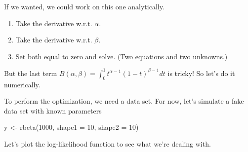 \documentclass[
]{book}
\newenvironment{Shaded}{\begin{snugshade}}{\end{snugshade}}
\newcommand{\AttributeTok}[1]{\textcolor[rgb]{0.77,0.63,0.00}{#1}}
\newcommand{\DecValTok}[1]{\textcolor[rgb]{0.00,0.00,0.81}{#1}}
\newcommand{\FunctionTok}[1]{\textcolor[rgb]{0.00,0.00,0.00}{#1}}
\newcommand{\NormalTok}[1]{#1}
\newcommand{\OtherTok}[1]{\textcolor[rgb]{0.56,0.35,0.01}{#1}}
\providecommand{\tightlist}{%
  \setlength{\itemsep}{0pt}\setlength{\parskip}{0pt}}
\begin{document}
If we wanted, we could work on this one analytically.

\begin{enumerate}
\def\labelenumi{\arabic{enumi}.}
\tightlist
\item
  Take the derivative w.r.t. \(\alpha\).
\item
  Take the derivative w.r.t. \(\beta\).
\item
  Set both equal to zero and solve. (Two equations and two unknowns.)
\end{enumerate}

But the last term
\(B(\alpha, \beta) = \int_0^1 t^{\alpha - 1}(1 - t)^{\beta - 1}dt\) is
tricky! So let's do it numerically.

To perform the optimization, we need a data set. For now, let's simulate
a fake data set with known parameters

\begin{Shaded}
\begin{Highlighting}[]
\NormalTok{y }\OtherTok{\textless{}{-}} \FunctionTok{rbeta}\NormalTok{(}\DecValTok{1000}\NormalTok{, }\AttributeTok{shape1 =} \DecValTok{10}\NormalTok{, }\AttributeTok{shape2 =} \DecValTok{10}\NormalTok{)}
\end{Highlighting}
\end{Shaded}

Let's plot the log-likelihood function to see what we're dealing with.
\end{document}
